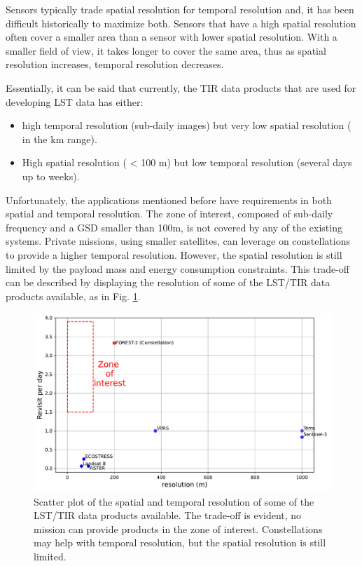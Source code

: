         Sensors typically trade spatial resolution for temporal resolution and, it has been difficult historically to maximize both.
        Sensors that have a high spatial resolution often cover a smaller area than a sensor with lower spatial resolution.
        With a smaller field of view, it takes longer to cover the same area, thus as spatial resolution increases, temporal resolution decreases.

        Essentially, it can be said that currently, the TIR data products that are used for developing LST data has either: 
        
        \begin{itemize}
            \item high temporal resolution (sub-daily images) but very low spatial resolution ( in the km range).
            \item High spatial resolution ( < 100 m) but low temporal resolution (several days up to weeks).
        \end{itemize}

        Unfortunately, the applications mentioned before have requirements in both spatial and temporal resolution. 
        The zone of interest, composed of sub-daily frequency and a GSD smaller than 100m, is not covered by any of the existing systems.
        Private missions, using smaller satellites, can leverage on constellations  to provide a higher temporal resolution.
        However, the spatial resolution is still limited by the payload mass and energy consumption constraints.
        This trade-off can be described by displaying the resolution of some of the LST/TIR data products available, as in Fig. \ref{fig:1-spatio-temporal-trade-off}. 

        \begin{figure}[H]
            \centering
            \includegraphics[width=\textwidth]{Includes/2-scatterplot-res-revisit.pdf}
            \caption{Scatter plot of the spatial and temporal resolution of some of the LST/TIR data products available.
                     The trade-off is evident, no mission can provide products in the zone of interest.
                     Constellations may help with temporal resolution, but the spatial resolution is still limited.}
            \label{fig:1-spatio-temporal-trade-off}
        \end{figure}

